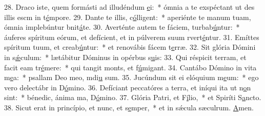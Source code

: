 28. Draco iste, quem formásti ad illudéndum \uline{e}i:~* ómnia a te exspéctant ut des illis escm in t\uline{é}mpore.
29. Dante te illis, c\uline{ó}lligent:~* aperiénte te manum tuam, ómnia implebúntur bnit\uline{á}te.
30. Averténte autem te fáciem, turbab\uline{ú}ntur:~* áuferes spíritum eórum, et defícient, et in púlverem suum rvert\uline{é}ntur.
31. Emíttes spíritum tuum, et creab\uline{ú}ntur:~* et renovábis fácem t\uline{e}rræ.
32. Sit glória Dómini in s\uline{ǽ}culum:~* lætábitur Dóminus in opérbus s\uline{u}is:
33. Qui réspicit terram, et facit eam tr\uline{é}mere:~* qui tangit monts, et f\uline{ú}migant.
34. Cantábo Dómino in vita m\uline{e}a:~* psallam Deo meo, mdi\uline{u} sum.
35. Jucúndum sit ei elóquium m\uline{e}um:~* ego vero delectábr in D\uline{ó}mino.
36. Defíciant peccatóres a terra, et iníqui ita ut n\uline{o}n sint:~* bénedic, ánima ma, D\uline{ó}mino.
37. Glória Patri, et F\uline{í}lio,~* et Spiríti S\uline{a}ncto.
38. Sicut erat in princípio, et nunc, et s\uline{e}mper,~* et in sǽcula sæculrum. \uline{A}men.
